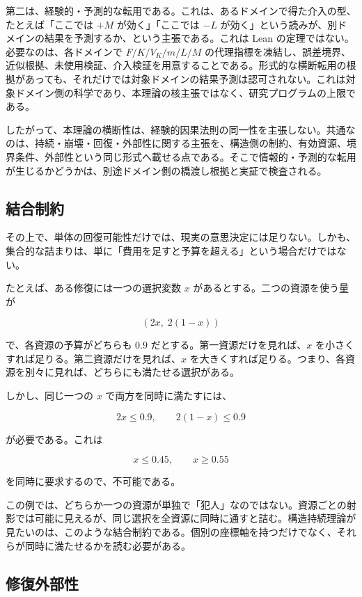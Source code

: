 \documentclass[12pt,a4paper]{article}
\begin{document}
第二は、経験的・予測的な転用である。これは、あるドメインで得た介入の型、たとえば「ここでは \(+M\) が効く」「ここでは \(-L\) が効く」という読みが、別ドメインの結果を予測するか、という主張である。これは Lean の定理ではない。必要なのは、各ドメインで \(F/K/V_K/m/L/M\) の代理指標を凍結し、誤差境界、近似根拠、未使用検証、介入検証を用意することである。形式的な横断転用の根拠があっても、それだけでは対象ドメインの結果予測は認可されない。これは対象ドメイン側の科学であり、本理論の核主張ではなく、研究プログラムの上限である。

したがって、本理論の横断性は、経験的因果法則の同一性を主張しない。共通なのは、持続・崩壊・回復・外部性に関する主張を、構造側の制約、有効資源、境界条件、外部性という同じ形式へ載せる点である。そこで情報的・予測的な転用が生じるかどうかは、別途ドメイン側の橋渡し根拠と実証で検査される。

\subsection{結合制約}\label{ux7d50ux5408ux5236ux7d04}

その上で、単体の回復可能性だけでは、現実の意思決定には足りない。しかも、集合的な詰まりは、単に「費用を足すと予算を超える」という場合だけではない。

たとえば、ある修復には一つの選択変数 \(x\) があるとする。二つの資源を使う量が

\[
(2x,\;2(1-x))
\]

で、各資源の予算がどちらも \(0.9\) だとする。第一資源だけを見れば、\(x\) を小さくすれば足りる。第二資源だけを見れば、\(x\) を大きくすれば足りる。つまり、各資源を別々に見れば、どちらにも満たせる選択がある。

しかし、同じ一つの \(x\) で両方を同時に満たすには、

\[
2x\leq 0.9,
\qquad
2(1-x)\leq 0.9
\]

が必要である。これは

\[
x\leq 0.45,
\qquad
x\geq 0.55
\]

を同時に要求するので、不可能である。

この例では、どちらか一つの資源が単独で「犯人」なのではない。資源ごとの射影では可能に見えるが、同じ選択を全資源に同時に通すと詰む。構造持続理論が見たいのは、このような結合制約である。個別の座標軸を持つだけでなく、それらが同時に満たせるかを読む必要がある。

\subsection{修復外部性}\label{ux4feeux5fa9ux5916ux90e8ux6027}
\end{document}
